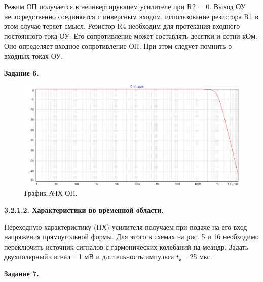 \documentclass[a4paper,14pt]{extarticle}
\begin{document}
    Режим ОП получается в неинвертирующем усилителе при R2 = 0. Выход ОУ 
    непосредственно соединяется с инверсным входом, использование резистора 
    R1 в этом случае теряет смысл. Резистор R4 необходим для протекания 
    входного постоянного тока ОУ. Его сопротивление может составлять 
    десятки и сотни кОм. Оно определяет входное сопротивление ОП. При этом 
    следует помнить о входных токах ОУ.
    \newpage

    \begin{center}
        \textbf{Задание 6.}
    \end{center}
    \begin{figure}[h!]
        \begin{center}
            \includegraphics[scale=0.5]{15.png}
        \end{center}
        \vspace{-0.7cm}
        \caption{График АЧХ ОП.}
    \end{figure}

    \begin{center}
        \textbf{3.2.1.2. Характеристики во временной области.}
    \end{center}

    Переходную характеристику (ПХ) усилителя получаем при подаче на его 
    вход напряжения прямоугольной формы. Для этого в схемах на рис. 5 и 16 
    необходимо переключить источник сигналов с гармонических колебаний на 
    меандр. Задать двухполярный сигнал ±1 мВ и длительность импульса $t_\text{и}$= 
    25 мкс.

    \begin{center}
        \textbf{Задание 7.}
    \end{center}
    
\end{document}
